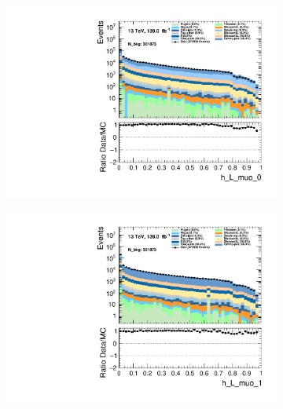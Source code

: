 \begin{figure}
\begin{subfigure}{.49\textwidth}
        \includegraphics[width=\textwidth]{Figures/MC_Data_comp/h_L_muo_0.pdf}
        \caption{ }
        \label{fig:fep}
    \end{subfigure}
    \hfill
    \begin{subfigure}{.49\textwidth}
        \includegraphics[width=\textwidth]{Figures/MC_Data_comp/h_L_muo_1.pdf}
        \caption{ }
        \label{fig:fe}
    \end{subfigure}
    \hfill       
    \caption{}
    \label{fig:t}
\end{figure}

